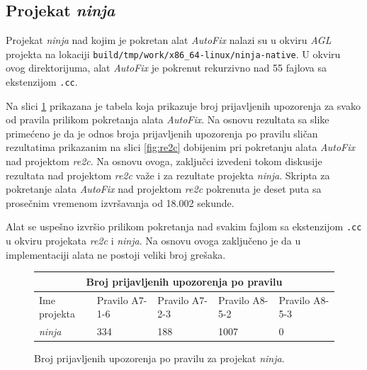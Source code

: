 \documentclass[12pt,oneside]{memoir}
\begin{document}
\subsection{Projekat \textit{ninja}}

Projekat \textit{ninja} nad kojim je pokretan alat \textit{AutoFix} nalazi su u okviru \textit{AGL} projekta na lokaciji \texttt{build/tmp/work/x86\_64-linux/ninja-native}. U okviru ovog direktorijuma, alat \textit{AutoFix} je pokrenut rekurzivno nad 55 fajlova sa ekstenzijom \texttt{.cc}. \par
Na slici \ref{fig:ninja} prikazana je tabela koja prikazuje broj prijavljenih upozorenja za svako od pravila prilikom pokretanja alata \textit{AutoFix}.
Na osnovu rezultata sa slike prime\'{c}eno je da je odnos broja prijavljenih upozorenja po pravilu sli\v{c}an rezultatima prikazanim na slici \ref{fig:re2c} dobijenim pri pokretanju alata \textit{AutoFix} nad projektom \textit{re2c}. Na osnovu ovoga, zaklju\v{c}ci izvedeni tokom diskusije rezultata nad projektom \textit{re2c} va\v{z}e i za rezultate projekta \textit{ninja}. Skripta za pokretanje alata \textit{AutoFix} nad projektom \textit{re2c} pokrenuta je deset puta sa prose\v{c}nim vremenom izvr\v{s}avanja od 18.002 sekunde.\par
Alat se uspe\v{s}no izvr\v{s}io prilikom pokretanja nad svakim fajlom sa ekstenzijom \texttt{.cc} u okviru projekata \textit{re2c} i \textit{ninja}. Na osnovu ovoga zaklju\v{c}eno je da u implementaciji alata ne postoji veliki broj gre\v{s}aka.
\begin{figure}
\begin{center}
\begin{tabular}{ |p{3cm}||p{2cm}|p{2cm}|p{2cm}|p{2cm}|  }
 \hline
 \multicolumn{5}{|c|}{Broj prijavljenih upozorenja po pravilu} \\
 \hline
 Ime projekta & Pravilo A7-1-6 & Pravilo A7-2-3 & Pravilo A8-5-2 & Pravilo A8-5-3\\
 \hline
 \textit{ninja}   & 334            & 188             & 1007            & 0\\
 \hline
\end{tabular}
\caption{Broj prijavljenih upozorenja po pravilu za projekat \textit{ninja}.}
\label{fig:ninja}
\end{center}
\end{figure}



\end{document}
